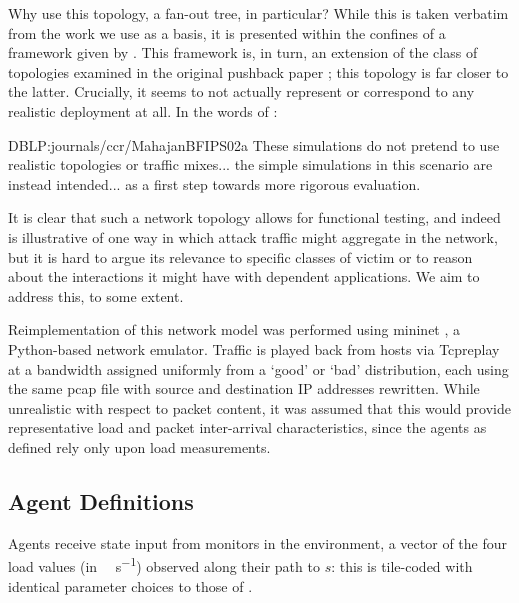 \documentclass[conference, letterpaper, 10pt, times]{IEEEtran}
\begin{document}
Why use this topology, a fan-out tree, in particular?
While this is taken verbatim from the work we use as a basis, it is presented within the confines of a framework given by \textcite{DBLP:journals/ton/YauLLY05}.
This framework is, in turn, an extension of the class of topologies examined in the original pushback paper \cite{DBLP:journals/ccr/MahajanBFIPS02a}; this topology is far closer to the latter.
Crucially, it seems to not actually represent or correspond to any realistic deployment at all.
In the words of \citeauthor{DBLP:journals/ccr/MahajanBFIPS02a}:
\begin{displaycquote}{DBLP:journals/ccr/MahajanBFIPS02a}
	These simulations do not pretend to use realistic topologies or traffic mixes... the simple simulations in this scenario are instead intended... as a first step towards more rigorous evaluation.
\end{displaycquote}
It is clear that such a network topology allows for functional testing, and indeed is illustrative of one way in which attack traffic might aggregate in the network, but it is hard to argue its relevance to specific classes of victim or to reason about the interactions it might have with dependent applications.
We aim to address this, to some extent.

Reimplementation of this network model was performed using mininet \cite{mininet}, a Python-based network emulator.
Traffic is played back from hosts via Tcpreplay at a bandwidth assigned uniformly from a `good' or `bad' distribution, each using the same pcap file with source and destination IP addresses rewritten.
While unrealistic with respect to packet content, it was assumed that this would provide representative load and packet inter-arrival characteristics, since the agents as defined rely only upon load measurements.

\subsection{Agent Definitions}

Agents receive state input from monitors in the environment, a vector of the four load values (in \si{\mega\bit\per\second}) observed along their path to $s$: this is tile-coded with identical parameter choices to those of \textcite{DBLP:phd/ethos/Malialis14}.
\end{document}
